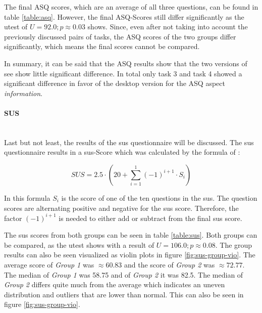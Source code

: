 The final ASQ scores, which are an average of all three questions, can be found in table \ref{table:asq}.
 However, the final ASQ-Scores still differ significantly as the \gls{utest} of $U=92.0; p \approx 0.03$ shows.
 Since, even after not taking into account the previously discussed pairs of tasks, the \gls{ASQ} scores of the two groups differ significantly, which means the final scores cannot be compared.

\begin{table}[htb]
  \caption{The \gls{ASQ}-scores from all 18 subjects. The first row contains the \gls{ASQ}-scores for the desktop application and the second row for the mobile application. The figures have been rounded to whole numbers.}
  \label{table:asq}
\end{table}

In summary, it can be said that the \gls{ASQ} results show that the two versions of \gls{see} show little significant difference. 
In total only task 3 and task 4 showed a significant difference in favor of the desktop version for the \gls{ASQ} aspect \textit{information}.
\paragraph{SUS}\mbox{}\\
Last but not least, the results of the \gls{sus} questionnaire will be discussed.
The \gls{sus} questionnaire results in a \gls{sus}-Score which was calculated by the formula of \cite{lewis2018system}:

\begin{equation}
SUS = 2.5 \cdot (20 + \sum_{i=1}^1 (-1)^{i+1} \cdot S_i)
\end{equation}

In this formula $S_i$ is the score of one of the ten questions in the \gls{sus}. 
The question scores are alternating positive and negative for the \gls{sus} score.
Therefore, the factor $(-1)^{i+1}$ is needed to either add or subtract from the final \gls{sus} score.

The \gls{sus} scores from both groups can be seen in table \ref{table:sus}.
Both groups can be compared, as the \gls{utest} shows with a result of $U=106.0; p \approx 0.08$. 
The group results can also be seen visualized as violin plots in figure \ref{fig:sus-group-vio}.
The average score of \textit{Group 1} was $ \approx 60.83$ and the score of \textit{Group 2} was $\approx 72.77$.
The median of \textit{Group 1} was 58.75 and of \textit{Group 2} it was 82.5.
The median of \textit{Group 2} differs quite much from the average which indicates an uneven distribution and outliers that are lower than normal.
This can also be seen in figure \ref{fig:sus-group-vio}.

